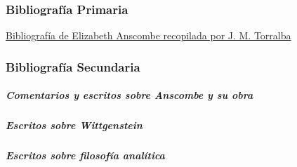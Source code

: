 \documentclass[12pt]{article}
\begin{document}
\subsubsection{Bibliografía Primaria}
\href{http://www.unav.es/filosofia/jmtorralba/anscombe/G.E.M.\_Anscombe\_Bibliography.htm}{Bibliografía de Elizabeth Anscombe recopilada por J. M. Torralba}
\subsubsection{Bibliografía Secundaria}
\subparagraph{Comentarios y escritos sobre Anscombe y su obra}
\subparagraph{Escritos sobre Wittgenstein}
\subparagraph{Escritos sobre filosofía analítica}
\end{document}
